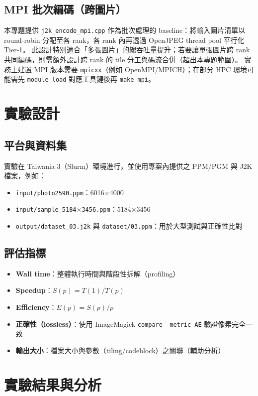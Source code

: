 \documentclass[UTF8,a4paper,12pt]{ctexart}
\begin{document}
\subsection{MPI 批次編碼（跨圖片）}
本專題提供 \texttt{j2k\_encode\_mpi.cpp} 作為批次處理的 baseline：將輸入圖片清單以 round-robin 分配至各 rank，各 rank 內再透過 OpenJPEG thread pool 平行化 Tier-1。
此設計特別適合「多張圖片」的總吞吐量提升；若要讓單張圖片跨 rank 共同編碼，則需額外設計跨 rank 的 tile 分工與碼流合併（超出本專題範圍）。
實務上建置 MPI 版本需要 \texttt{mpicxx}（例如 OpenMPI/MPICH）；在部分 HPC 環境可能需先 \texttt{module load} 對應工具鏈後再 \texttt{make mpi}。

\section{實驗設計}
\subsection{平台與資料集}
實驗在 Taiwania 3（Slurm）環境進行，並使用專案內提供之 PPM/PGM 與 J2K 檔案，例如：
\begin{itemize}
  \item \texttt{input/photo2590.ppm}：6016$\times$4000
  \item \texttt{input/sample\_5184$\times$3456.ppm}：5184$\times$3456
  \item \texttt{output/dataset\_03.j2k} 與 \texttt{dataset/03.ppm}：用於大型測試與正確性比對
\end{itemize}

\subsection{評估指標}
\begin{itemize}
  \item \textbf{Wall time}：整體執行時間與階段性拆解（profiling）
  \item \textbf{Speedup}：$S(p)=T(1)/T(p)$
  \item \textbf{Efficiency}：$E(p)=S(p)/p$
  \item \textbf{正確性（lossless）}：使用 ImageMagick \texttt{compare -metric AE} 驗證像素完全一致
  \item \textbf{輸出大小}：檔案大小與參數（tiling/codeblock）之關聯（輔助分析）
\end{itemize}

\section{實驗結果與分析}
\end{document}
